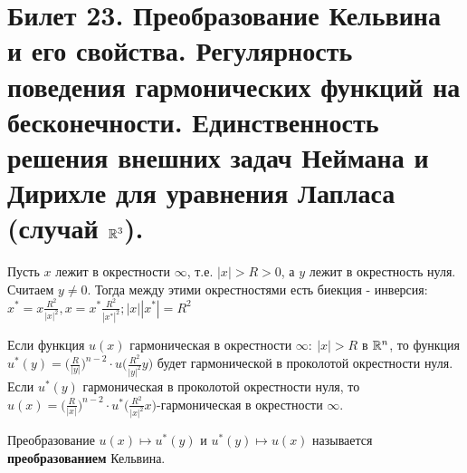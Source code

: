 \section{Билет 23. Преобразование Кельвина и его свойства. Регулярность поведения гармонических функций на бесконечности. Единственность решения внешних задач Неймана и Дирихле для уравнения Лапласа (случай $\mathbb{R}^3$).}
Пусть $x$ лежит в окрестности $\infty$, т.е. $|x|>R>0$, а $y$ лежит в окрестность нуля. Считаем $y \neq 0.$ Тогда между этими окрестностями есть биекция - инверсия:
$x^*=x \frac{R^2}{|x|^2},x=x^* \frac{R^2}{|x^*|^2}; |x||x^*|=R^2 $
\begin{lemma}
Если функция $u(x)$ гармоническая в окрестности $\infty: \ |x|>R$ в $\mathbb{R}^n$, то функция $u^*(y)= \big(\frac{R}{|y|}\big)^{n-2}\cdot u(\frac{R^2}{|y|^2} y\big)$ будет гармонической в проколотой окрестности нуля. Если $u^*(y)$ гармоническая в проколотой окрестности нуля, то $u(x)= \big(\frac{R}{|x|}\big)^{n-2}\cdot u^*(\frac{R^2}{|x|^2} x\big)$-гармоническая в окрестности $\infty$.
\end{lemma}
\begin{definition}
Преобразование $u(x) \longmapsto u^*(y)$ и $u^*(y) \longmapsto u(x)$ называется \textbf{преобразованием} Кельвина.
\end{definition}
